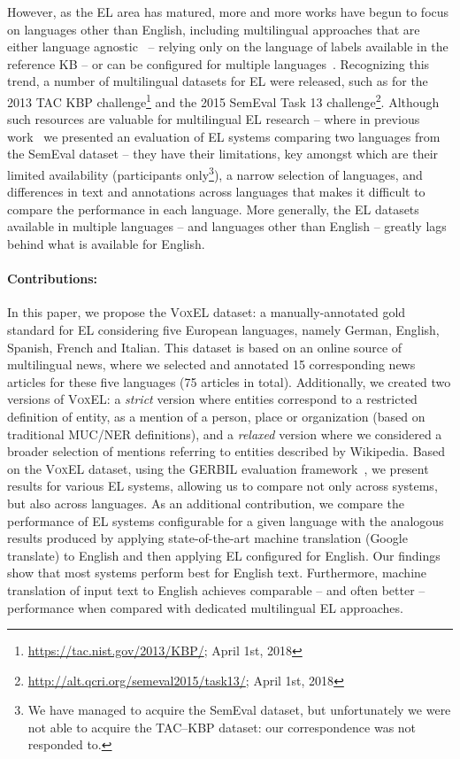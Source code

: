 \documentclass{llncs}
\begin{document}
However, as the EL area has matured, more and more works have begun to focus on languages other than English, including multilingual approaches that are either language agnostic~\cite{THD-dojchinovski2012recognizing,daiber2013improving,ferragina2010tagme,mag2017} -- relying only on the language of labels available in the reference KB -- or can be configured for multiple languages~\cite{Babelfy-moro2014entity,freme-ner2016}. Recognizing this trend, a number of multilingual datasets for EL were released, such as for the 2013 TAC KBP challenge\footnote{\url{https://tac.nist.gov/2013/KBP/}; April 1st, 2018} %
and the 2015 SemEval Task 13 challenge\footnote{\url{http://alt.qcri.org/semeval2015/task13/}; April 1st, 2018}. Although such resources are valuable for multilingual EL research -- where in previous work~\cite{Rosales-MendezP17} we presented an evaluation of EL systems comparing two languages from the SemEval dataset -- they have their limitations, key amongst which are their limited availability (participants only\footnote{We have managed to acquire the SemEval dataset, but unfortunately we were not able to acquire the TAC--KBP dataset: our correspondence was not responded to.}), a narrow selection of languages, and differences in text and annotations across languages that makes it difficult to compare the performance in each language. More generally, the EL datasets available in multiple languages -- and languages other than English -- greatly lags behind what is available for English.

\paragraph{Contributions:} In this paper, we propose the \textsc{VoxEL} dataset: a manually-annotated gold standard for EL considering five European languages, namely German, English, Spanish, French and Italian. This dataset is based on an online source of multilingual news, where we selected and annotated 15 corresponding news articles for these five languages (75 articles in total). Additionally, we created two versions of \textsc{VoxEL}: a \textit{strict} version where entities correspond to a restricted definition of entity, as a mention of a person, place or organization (based on traditional MUC/NER definitions), and a \textit{relaxed} version where we considered a broader selection of mentions referring to entities described by Wikipedia. Based on the \textsc{VoxEL} dataset, using the GERBIL evaluation framework~\cite{gerbil-2015}, we present results for various EL systems, allowing us to compare not only across systems, but also across languages. As an additional contribution, we compare the performance of EL systems configurable for a given language with the analogous results produced by applying state-of-the-art machine translation (Google translate) to English and then applying EL configured for English. Our findings show that most systems perform best for English text. Furthermore, machine translation of input text to English achieves comparable -- and often better -- performance when compared with dedicated multilingual EL approaches. 
\end{document}
